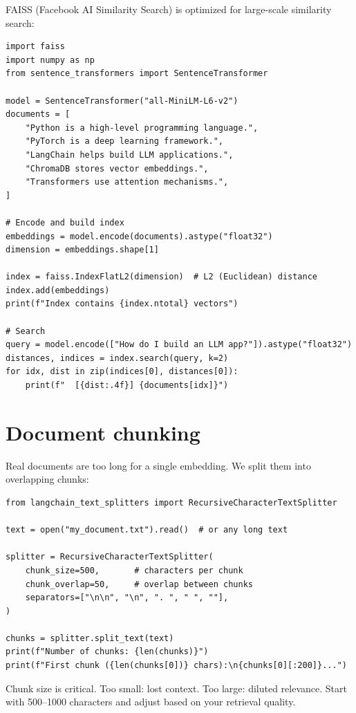 FAISS (Facebook AI Similarity Search) is optimized for large-scale similarity search:

\begin{verbatim}
import faiss
import numpy as np
from sentence_transformers import SentenceTransformer

model = SentenceTransformer("all-MiniLM-L6-v2")
documents = [
    "Python is a high-level programming language.",
    "PyTorch is a deep learning framework.",
    "LangChain helps build LLM applications.",
    "ChromaDB stores vector embeddings.",
    "Transformers use attention mechanisms.",
]

# Encode and build index
embeddings = model.encode(documents).astype("float32")
dimension = embeddings.shape[1]

index = faiss.IndexFlatL2(dimension)  # L2 (Euclidean) distance
index.add(embeddings)
print(f"Index contains {index.ntotal} vectors")

# Search
query = model.encode(["How do I build an LLM app?"]).astype("float32")
distances, indices = index.search(query, k=2)
for idx, dist in zip(indices[0], distances[0]):
    print(f"  [{dist:.4f}] {documents[idx]}")
\end{verbatim}

\section{Document chunking}

Real documents are too long for a single embedding. We split them into overlapping chunks:

\begin{verbatim}
from langchain_text_splitters import RecursiveCharacterTextSplitter

text = open("my_document.txt").read()  # or any long text

splitter = RecursiveCharacterTextSplitter(
    chunk_size=500,       # characters per chunk
    chunk_overlap=50,     # overlap between chunks
    separators=["\n\n", "\n", ". ", " ", ""],
)

chunks = splitter.split_text(text)
print(f"Number of chunks: {len(chunks)}")
print(f"First chunk ({len(chunks[0])} chars):\n{chunks[0][:200]}...")
\end{verbatim}

\begin{warningbox}
Chunk size is critical. Too small: lost context. Too large: diluted relevance. Start with 500--1000 characters and adjust based on your retrieval quality.
\end{warningbox}

